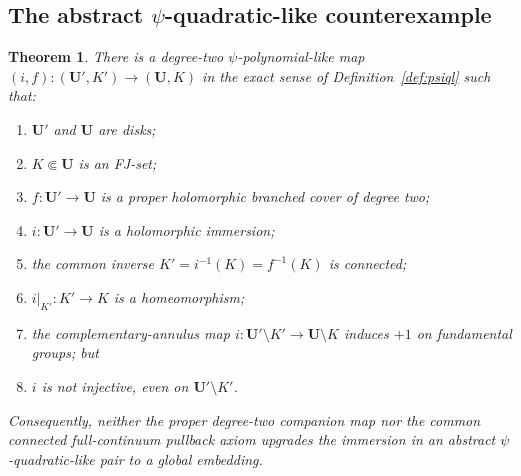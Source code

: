 \documentclass[11pt,reqno]{amsart}
\newtheorem{theorem}{Theorem}[section]
\theoremstyle{definition}
\theoremstyle{remark}
\begin{document}
\subsection{The abstract $\psi$-quadratic-like counterexample}
\begin{theorem}\label{thm:psiql-nogo}
There is a degree-two \(\psi\)-polynomial-like map \((i,f):(\mathbf U',K')\to(\mathbf U,K)\) in the exact sense of Definition~\ref{def:psiql} such that:
\begin{enumerate}
\item \(\mathbf U'\) and \(\mathbf U\) are disks;
\item \(K\Subset\mathbf U\) is an FJ-set;
\item \(f:\mathbf U'\to\mathbf U\) is a proper holomorphic branched cover of degree two;
\item \(i:\mathbf U'\to\mathbf U\) is a holomorphic immersion;
\item the common inverse \(K'=i^{-1}(K)=f^{-1}(K)\) is connected;
\item \(i|_{K'}:K'\to K\) is a homeomorphism;
\item the complementary-annulus map \(i:\mathbf U'\setminus K'\to\mathbf U\setminus K\) induces \(+1\) on fundamental groups; but
\item \(i\) is not injective, even on \(\mathbf U'\setminus K'\).
\end{enumerate}
Consequently, neither the proper degree-two companion map nor the common connected full-continuum pullback axiom upgrades the immersion in an abstract \(\psi\)-quadratic-like pair to a global embedding.
\end{theorem}
\end{document}

